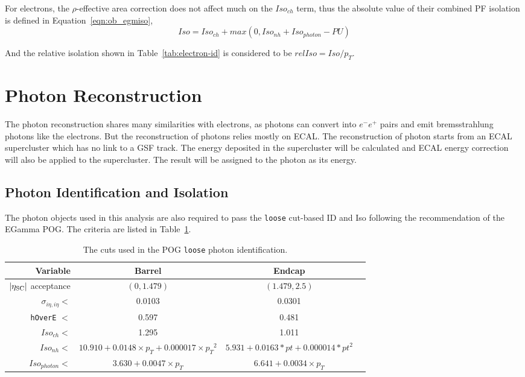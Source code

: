 \vspace{0.3cm}
For electrons, the $\rho$-effective area correction does not affect much on the $Iso_{ch}$ term, thus the absolute value of their combined PF isolation is defined in Equation~\ref{eqn:ob_egmiso},
\begin{equation}
Iso=Iso_{ch}+max(0,Iso_{nh}+Iso_{photon}-PU)
\label{eqn:ob_egmiso}
\end{equation}

And the relative isolation shown in Table~\ref{tab:electron-id} is considered to be $relIso=Iso/p_{T}$.

\section{Photon Reconstruction}
The photon reconstruction shares many similarities with electrons, as photons can convert into $e^{-}e^{+}$ pairs and emit bremsstrahlung photons like the electrons. But the reconstruction of photons relies mostly on ECAL. The reconstruction of photon starts from an ECAL supercluster which has no link to a GSF track. The energy deposited in the supercluster will be calculated and ECAL energy correction will also be applied to the supercluster. The result will be assigned to the photon as its energy.

\subsection{Photon Identification and Isolation}
The photon objects used in this analysis are also required to pass the \texttt{loose} cut-based ID and Iso following the recommendation of the EGamma POG. The criteria are listed in Table~\ref{tab:photon-id}.
\begin{table}[htb!]
  \center
  \caption{The cuts used in the POG \texttt{loose} photon identification.}
  \label{tab:photon-id}
  \begin{tabular}{r c c c}
    \hline
    Variable & Barrel & Endcap \\
    \hline
    $|\eta_{\rm SC}|$ acceptance & $(0, 1.479)$ & $(1.479, 2.5)$\\
    $\sigma_{i\eta,i\eta} <$ & 0.0103  & 0.0301 \\
    \texttt{hOverE} $<$ & 0.597  & 0.481 \\
    $Iso_{ch} <$ & 1.295 & 1.011 \\
    $Iso_{nh} <$ & $10.910+0.0148\times p_{T}+0.000017\times {p_{T}}^2$ & $5.931+0.0163*pt+0.000014*pt^2$ \\
    $Iso_{photon} <$ & $3.630+0.0047\times p_{T}$ & $6.641+0.0034\times p_{T}$ \\
    \hline
  \end{tabular}
\end{table}

